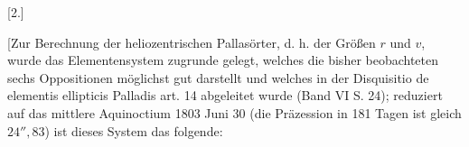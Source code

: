 \par{}\bigskip
{}
\begin{center}[2.]\end{center}
\begingroup
\newcommand{\IIILeaderPoint}{.\kern1.1pt}
\newcommand{\IIILeaderUpperLeft}{\rlap{\kern-.05em\raisebox{.5ex}{.}}\IIILeaderPoint}
\newcommand{\IIILeaderUpperRight}{\rlap{\kern.12em\raisebox{.5ex}{.}}\IIILeaderPoint}
\noindent\hspace*{\parindent}[Zur Berechnung der heliozentrischen Pallasörter, d. h. der Größen \(r\) und \(v\), wurde das Elementensystem zugrunde gelegt, welches die bisher beobachteten sechs Oppositionen möglichst gut darstellt und welches in der Disquisitio de elementis ellipticis Palladis art. 14 abgeleitet wurde (Band VI S. 24); reduziert auf das mittlere Aquinoctium 1803 Juni 30 (die Präzession in 181 Tagen ist gleich \(24'',\!83\)) ist dieses System das folgende:
